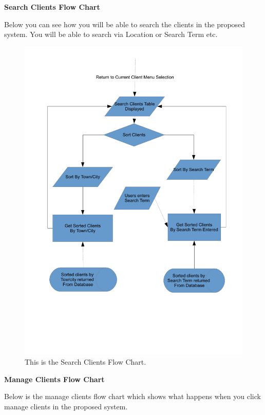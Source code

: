 \pagebreak
\textbf{Search Clients Flow Chart}
\begin{flushleft}
Below you can see how you will be able to search the clients in the proposed system. You will be able to search via Location or Search Term etc.
\end{flushleft}
\begin{figure}[H]
\includegraphics[scale=0.5]{./Design/images/FlowChartSearchClients.pdf}
    \caption{This is the Search Clients Flow Chart.} 
\label{fig:FlowChartSearchClients}
\end{figure}

\pagebreak
\textbf{Manage Clients Flow Chart}
\begin{flushleft}
Below is the manage clients flow chart which shows what happens when you click manage clients in the proposed system.
\end{flushleft}

